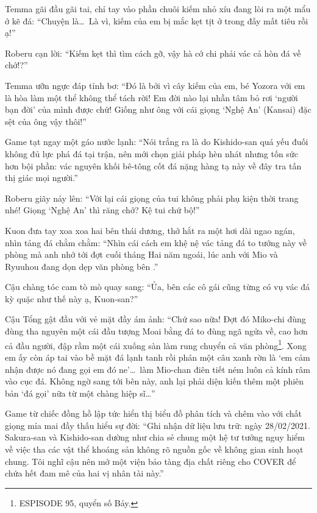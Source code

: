 \documentclass[../main.tex]{subfiles}
\begin{document}
Temma gãi đầu gãi tai, chỉ tay vào phần chuôi kiếm nhỏ xíu đang lòi ra một mẩu ở kẽ đá: ``Chuyện là\dots\ Là vì, kiếm của em bị mắc kẹt tịt ở trong đấy mất tiêu rồi ạ!''

Roberu cạn lời: ``Kiếm kẹt thì tìm cách gỡ, vậy hà cớ chi phải vác cả hòn đá về chớ!?''

Temma ưỡn ngực đáp tỉnh bơ: ``Đó là bởi vì cây kiếm của em, bé Yozora với em là hòa làm một thể không thể tách rời! Em đời nào lại nhẫn tâm bỏ rơi `người bạn đời' của mình được chứ! Giống như ông với cái giọng `Nghệ An' (Kansai) đặc sệt của ông vậy thôi!''

Game tạt ngay một gáo nước lạnh: ``Nói trắng ra là do Kishido-san quá yếu đuối không đủ lực phá đá tại trận, nên mới chọn giải pháp hèn nhát nhưng tốn sức hơn bội phần: vác nguyên khối bê-tông cốt đá nặng hàng tạ này về đây tra tấn thị giác mọi người.''

Roberu giãy nảy lên: ``Với lại cái giọng của tui không phải phụ kiện thời trang nhé! Giọng `Nghệ An' thì răng chớ? Kệ tui chứ bộ!''

Kuon đưa tay xoa xoa hai bên thái dương, thở hắt ra một hơi dài ngao ngán, nhìn tảng đá chằm chằm: ``Nhìn cái cách em khệ nệ vác tảng đá to tướng này về phòng mà anh nhớ tới đợt cuối tháng Hai năm ngoái, lúc anh với Mio và Ryuuhou đang dọn dẹp văn phòng bên \hll.''

Cậu chàng tóc cam tò mò quay sang: ``Ủa, bên các cô gái cũng từng có vụ vác đá kỳ quặc như thế này ạ, Kuon-san?''

Cậu Tổng gật đầu với vẻ mặt đầy ám ảnh: ``Chứ sao nữa! Đợt đó Miko-chi đùng đùng tha nguyên một cái đầu tượng Moai bằng đá to đùng ngã ngửa về, cao hơn cả đầu người, đập rầm một cái xuống sàn làm rung chuyển cả văn phòng\footnote{{\flaregothic ESPISODE 95}, quyển số Bảy.}. Xong em ấy còn áp tai vào bề mặt đá lạnh tanh rồi phán một câu xanh rờn là `em cảm nhận được nó đang gọi em đó ne'\dots\ làm Mio-chan điên tiết ném luôn cả kính râm vào cục đá. Không ngờ sang tới bên này, anh lại phải diện kiến thêm một phiên bản `đá gọi' nữa từ một chàng hiệp sĩ\dots''

Game từ chiếc đồng hồ lập tức hiển thị biểu đồ phân tích và chêm vào với chất giọng mỉa mai đầy thấu hiểu sự đời: ``Ghi nhận dữ liệu lưu trữ: ngày 28/02/2021. Sakura-san và Kishido-san dường như chia sẻ chung một hệ tư tưởng nguy hiểm về việc tha các vật thể khoáng sản không rõ nguồn gốc về không gian sinh hoạt chung. Tôi nghĩ cậu nên mở một viện bảo tàng địa chất riêng cho COVER để chứa hết đam mê của hai vị nhân tài này.''
\end{document}
